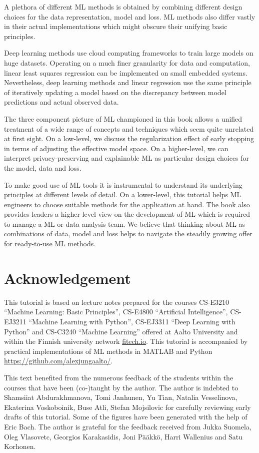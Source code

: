 \documentclass[12pt]{report}
\begin{document}
A plethora of different ML methods is obtained by combining different design 
choices for the data representation, model and loss. ML methods also differ 
vastly in their actual implementations which might obscure their unifying 
basic principles. 

Deep learning methods use cloud computing frameworks to train large 
models on huge datasets. Operating on a much finer granularity for 
data and computation, linear least squares regression can be implemented 
on small embedded systems. Nevertheless, deep learning methods and 
linear regression use the same principle of iteratively updating a model 
based on the discrepancy between model predictions and actual observed 
data. 

The three component picture of ML championed in this book allows a 
unified treatment of a wide range of concepts and techniques 
which seem quite unrelated at first sight. On a low-level, we discuss 
the regularization effect of early stopping in terms of adjusting the effective 
model space. On a higher-level, we can interpret privacy-preserving 
and explainable ML as particular design choices for the model, data and loss. 

To make good use of ML tools it is instrumental to understand 
its underlying principles at different levels of detail. On a lower-level, 
this tutorial helps ML engineers to choose suitable methods for 
the application at hand. The book also provides leaders a 
higher-level view on the development of ML which is required 
to manage a ML or data analysis team. We believe that thinking 
about ML as combinations of data, model and loss helps to navigate 
the steadily growing offer for ready-to-use ML methods. 

\section*{Acknowledgement}
This tutorial is based on lecture notes prepared for the 
courses CS-E3210 ``Machine Learning: Basic Principles'', 
CS-E4800 ``Artificial Intelligence'', CS-EJ3211 ``Machine 
Learning with Python'', CS-EJ3311 ``Deep Learning with Python'' 
and CS-C3240 ``Machine Learning'' offered at Aalto 
University and within the Finnish university network 
\url{fitech.io}. This tutorial is accompanied by practical 
implementations of ML methods in MATLAB and 
Python \url{https://github.com/alexjungaalto/}. 

This text benefited from the numerous feedback of the 
students within the courses that have been (co-)taught 
by the author. The author is indebted to Shamsiiat Abdurakhmanova, 
Tomi Janhunen, Yu Tian, Natalia Vesselinova, Ekaterina Voskoboinik, 
Buse Atli, Stefan Mojsilovic for carefully reviewing early 
drafts of this tutorial. Some of the figures have been 
generated with the help of Eric Bach. The author is grateful 
for the feedback received from Jukka Suomela, Oleg Vlasovetc, 
Georgios Karakasidis, Joni P{\"a}{\"a}kk{\"o}, Harri Wallenius and 
Satu Korhonen. 
\end{document}
